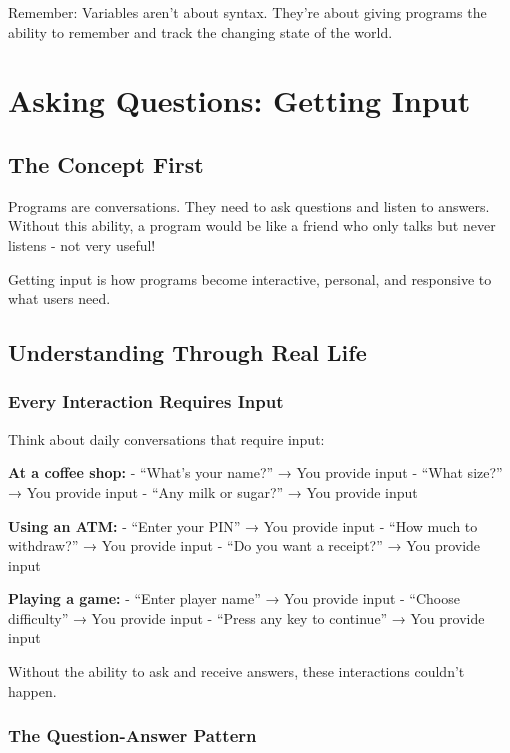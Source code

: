 \documentclass[
  letterpaper,
  DIV=11,
  numbers=noendperiod,
  oneside]{scrreprt}
\begin{document}
Remember: Variables aren't about syntax. They're about giving programs
the ability to remember and track the changing state of the world.

\chapter{Asking Questions: Getting Input}\label{sec-input}

\section{The Concept First}\label{the-concept-first-2}

Programs are conversations. They need to ask questions and listen to
answers. Without this ability, a program would be like a friend who only
talks but never listens - not very useful!

Getting input is how programs become interactive, personal, and
responsive to what users need.

\section{Understanding Through Real
Life}\label{understanding-through-real-life-2}

\subsection{Every Interaction Requires
Input}\label{every-interaction-requires-input}

Think about daily conversations that require input:

\textbf{At a coffee shop:} - ``What's your name?'' → You provide input -
``What size?'' → You provide input - ``Any milk or sugar?'' → You
provide input

\textbf{Using an ATM:} - ``Enter your PIN'' → You provide input - ``How
much to withdraw?'' → You provide input - ``Do you want a receipt?'' →
You provide input

\textbf{Playing a game:} - ``Enter player name'' → You provide input -
``Choose difficulty'' → You provide input - ``Press any key to
continue'' → You provide input

Without the ability to ask and receive answers, these interactions
couldn't happen.

\subsection{The Question-Answer
Pattern}\label{the-question-answer-pattern}
\end{document}
